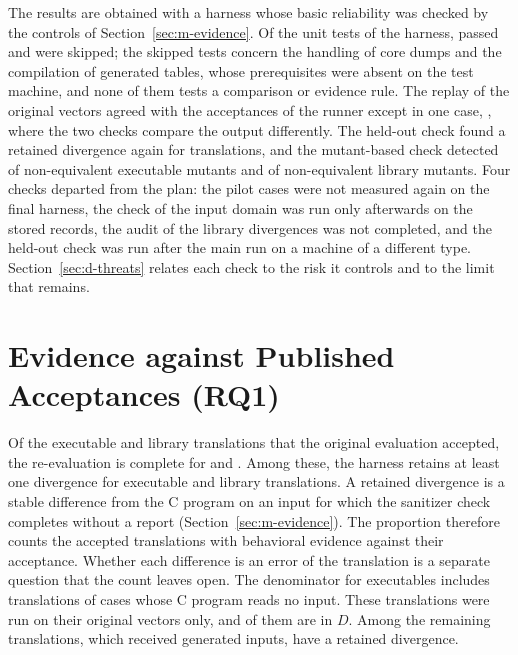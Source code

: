 The results are obtained with a harness whose basic reliability was checked by the controls of Section~\ref{sec:m-evidence}. Of the \sUnitRun{} unit tests of the harness, \sUnitPass{} passed and \sUnitSkip{} were skipped; the skipped tests concern the handling of core dumps and the compilation of generated tables, whose prerequisites were absent on the test machine, and none of them tests a comparison or evidence rule. The replay of the original vectors agreed with the acceptances of the runner except in one case, , where the two checks compare the output differently. The held-out check found a retained divergence again for  translations, and the mutant-based check detected \sMutExeK{} of \sMutExeN{} non-equivalent executable mutants and \sMutLibK{} of \sMutLibN{} non-equivalent library mutants. Four checks departed from the plan: the pilot cases were not measured again on the final harness, the check of the input domain was run only afterwards on the stored records, the audit of the library divergences was not completed, and the held-out check was run after the main run on a machine of a different type. Section~\ref{sec:d-threats} relates each check to the risk it controls and to the limit that remains.

\section{Evidence against Published Acceptances (RQ1)}\label{sec:r-rq1}

Of the \rqPaccExeAllNum{} executable and \rqPaccLibAllNum{} library translations that the original evaluation accepted, the re-evaluation is complete for \rqPtestExeAllNum{} and \rqPtestLibAllNum{}. Among these, the harness retains at least one divergence for  executable and  library translations. A retained divergence is a stable difference from the C program on an input for which the sanitizer check completes without a report (Section~\ref{sec:m-evidence}). The proportion therefore counts the accepted translations with behavioral evidence against their acceptance. Whether each difference is an error of the translation is a separate question that the count leaves open. The denominator for executables includes \rqInsensPtestExeAllNum{} translations of cases whose C program reads no input. These translations were run on their original vectors only, and \rqInsensDExeAllNum{} of them are in $D$. Among the remaining translations, which received generated inputs,  have a retained divergence.

